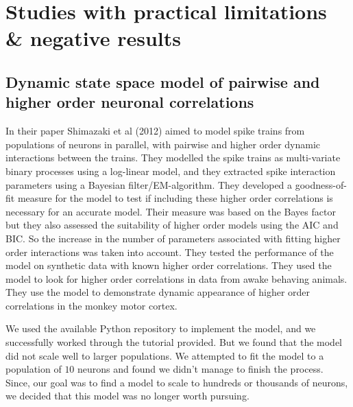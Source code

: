 \chapter{Studies with practical limitations \& negative results}

\label{chap:small}


\section{Dynamic state space model of pairwise and higher order neuronal correlations}
In their paper Shimazaki et al (2012) aimed to model spike trains from populations of neurons in parallel, with pairwise and higher order dynamic interactions between the trains. They modelled the spike trains as multi-variate binary processes using a log-linear model, and they extracted spike interaction parameters using a Bayesian filter/EM-algorithm. They developed a goodness-of-fit measure for the model to test if including these higher order correlations is necessary for an accurate model. Their measure was based on the Bayes factor but they also assessed the suitability of higher order models using the AIC and BIC. So the increase in the number of parameters associated with fitting higher order interactions was taken into account. They tested the performance of the model on synthetic data with known higher order correlations. They used the model to look for higher order correlations in data from awake behaving animals. They use the model to demonstrate dynamic appearance of higher order correlations in the monkey motor cortex\cite{shimazaki}.

We used the available Python repository to implement the model, and we successfully worked through the tutorial provided. But we found that the model did not scale well to larger populations. We attempted to fit the model to a population of $10$ neurons and found we didn't manage to finish the process. Since, our goal was to find a model to scale to hundreds or thousands of neurons, we decided that this model was no longer worth pursuing.

